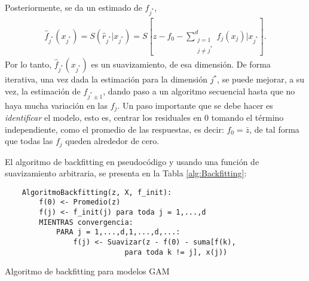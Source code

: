 \documentclass[../Main/Main.tex]{subfiles}
\begin{document}
Posteriormente, se da un estimado de $f_{j^*}$,
\begin{align}
	\hat{f}_{j^*}(x_{j^*}) = S(\hat{r}_{j^*}|x_{j^*}) = S[z - f_0 - \sum_{\substack{j=1\\ j \neq j^*}}^d f_j(x_j)|x_{j^*}].
\end{align}
Por lo tanto, $\hat{f}_{j^*}(x_{j^*})$ es un suavizamiento, de esa dimensión. De forma iterativa, una vez dada la estimación para la  dimensión $j^*$, se puede mejorar, a su vez, la estimación de $f_{j^*\pm 1}$, dando paso a un algoritmo secuencial hasta que no haya mucha variación en las $f_j$. Un paso importante que se debe hacer es \textit{identificar} el modelo, esto es, centrar los residuales en $0$ tomando el término independiente, como el promedio de las respuestas, es decir: $f_0 = \bar{z}$, de tal forma que todas las $f_j$ queden alrededor de cero. 

El algoritmo de backfitting en pseudocódigo y usando una función de suavizamiento arbitraria, se presenta en la Tabla \ref{alg:Backfitting}:

\begin{table}[h]
\makebox[\linewidth]{\rule{\textwidth}{0.4pt}}
\begin{verbatim}
    AlgoritmoBackfitting(z, X, f_init):
        f(0) <- Promedio(z)
        f(j) <- f_init(j) para toda j = 1,...,d
        MIENTRAS convergencia:
            PARA j = 1,...,d,1,...,d,...:
                f(j) <- Suavizar(z - f(0) - suma[f(k), 
                			para toda k != j], x(j)) 
\end{verbatim}
\makebox[\linewidth]{\rule{\textwidth}{0.4pt}}
\caption{Algoritmo de backfitting para modelos GAM}
\label{alg:Backfitting}
\end{table}
\end{document}

